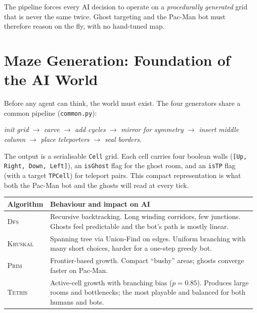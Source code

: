 \documentclass[11pt,a4paper]{article}
\begin{document}
\begin{infobox}
The pipeline forces every AI decision to operate on a \emph{procedurally
generated} grid that is never the same twice. Ghost targeting and the
Pac-Man bot must therefore reason on the fly, with no hand-tuned map.
\end{infobox}

\section{Maze Generation: Foundation of the AI World}

Before any agent can think, the world must exist. The four generators
share a common pipeline (\texttt{common.py}):

\begin{center}\small
\textit{init grid} $\rightarrow$ \textit{carve} $\rightarrow$
\textit{add cycles} $\rightarrow$ \textit{mirror for symmetry} $\rightarrow$
\textit{insert middle column} $\rightarrow$ \textit{place teleporters}
$\rightarrow$ \textit{seal borders}.
\end{center}

The output is a serialisable \texttt{Cell} grid. Each cell carries four
boolean walls (\texttt{[Up, Right, Down, Left]}), an \texttt{isGhost}
flag for the ghost room, and an \texttt{isTP} flag (with a target
\texttt{TPCell}) for teleport pairs. This compact representation is what
both the Pac-Man bot and the ghosts will read at every tick.

\begin{table}[h]
\centering\small
\renewcommand{\arraystretch}{1.15}
\begin{tabularx}{\linewidth}{l X}
\toprule
\textbf{Algorithm} & \textbf{Behaviour and impact on AI} \\
\midrule
\textsc{Dfs}     & Recursive backtracking. Long winding corridors, few
                   junctions. Ghosts feel predictable and the bot's path is
                   mostly linear. \\
\textsc{Kruskal} & Spanning tree via Union-Find on edges. Uniform branching
                   with many short choices, harder for a one-step greedy
                   bot. \\
\textsc{Prim}    & Frontier-based growth. Compact ``bushy'' areas;
                   ghosts converge faster on Pac-Man. \\
\textsc{Tetris}  & Active-cell growth with branching bias ($p\!=\!0.85$).
                   Produces large rooms and bottlenecks; the most playable
                   and balanced for both humans and bots. \\
\bottomrule
\end{tabularx}
\end{table}
\end{document}
